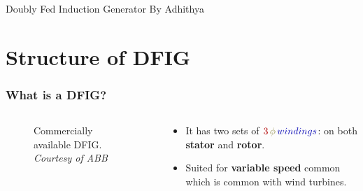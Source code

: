 \documentclass{beamer}
\date{October 3 2023}
\begin{document}
\begin{frame}{Doubly Fed Induction Generator}
\centering By Adhithya
\begin{figure}
    \centering
\end{figure}
\end{frame}

\section{Structure of DFIG}

\begin{frame}
  \frametitle{What is a DFIG?}
  
  \begin{columns}
    \begin{column}{0.6\textwidth} 
    \begin{figure}
        \centering
        \caption{Commercially available DFIG.
        \textit{Courtesy of ABB}}
    \end{figure}
    \end{column}
    
    \begin{column}{0.4\textwidth} %
      \begin{itemize}
        \item It has two sets of $\textcolor{red!70!black}{3} \, \textcolor{yellow!50!black}{\phi} \, \textcolor{blue!70!black}{windings}$: on both \textbf{stator} and \textbf{rotor}.
        
        \item Suited for \textbf{variable speed} common which is common with wind turbines.
      \end{itemize}
    \end{column}
  \end{columns}
\end{frame}
\end{document}

